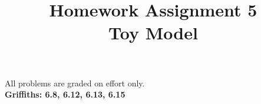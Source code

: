 \documentclass[12pt]{article}
\begin{document}
\date{\vspace{-5ex}}

\title{Homework Assignment 5 \\ Toy Model}

\maketitle

\noindent
All problems are graded on effort only.\\

\noindent
{\bf Griffiths: 6.8, 6.12, 6.13, 6.15}\\
\end{document}
